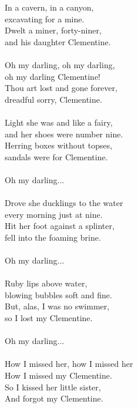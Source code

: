 
            In a cavern, in a canyon, \\
            excavating for a mine. \\
            Dwelt a miner, forty-niner, \\
            and his daughter Clementine. \\
\hspace{10mm} \\
            Oh my darling, oh my darling, \\
            oh my darling Clementine! \\
            Thou art lost and gone forever, \\
            dreadful sorry, Clementine. \\
\hspace{10mm} \\
            Light she was and like a fairy, \\
            and her shoes were number nine. \\
            Herring boxes without topses, \\
            sandals were for Clementine. \\
\hspace{10mm} \\
            Oh my darling... \\
\hspace{10mm} \\
            Drove she ducklings to the water \\
            every morning just at nine. \\
            Hit her foot against a splinter, \\
            fell into the foaming brine. \\
\hspace{10mm} \\
            Oh my darling... \\
\hspace{10mm} \\
            Ruby lips above water, \\
            blowing bubbles soft and fine. \\
            But, alas, I was no swimmer, \\
            so I lost my Clementine. \\
\hspace{10mm} \\
            Oh my darling... \\
\hspace{10mm} \\
            How I missed her, how I missed her \\
            How I missed my Clementine. \\
            So I kissed her little sister, \\
            And forgot my Clementine. \\
